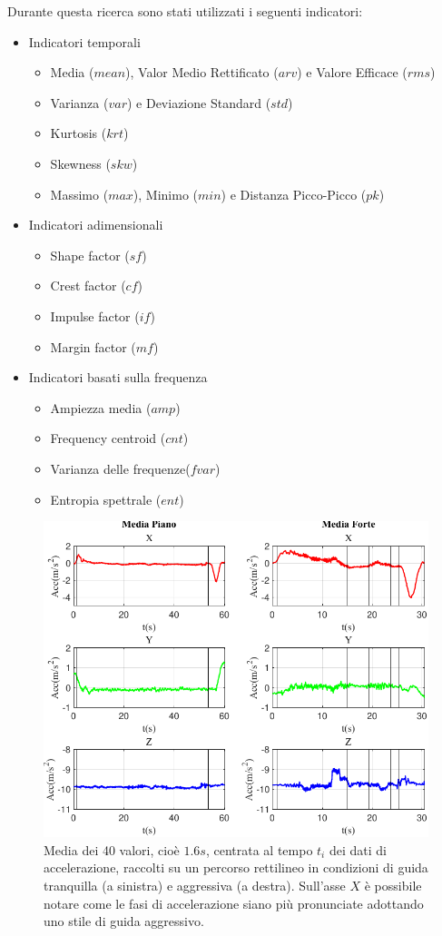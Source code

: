\documentclass[class=article]{standalone}
\begin{document}
	Durante questa ricerca sono stati utilizzati i seguenti indicatori:
	\begin{itemize}
		\item Indicatori temporali
		\begin{itemize}
			\item Media (\(mean\)), Valor Medio Rettificato (\(arv\)) e Valore Efficace (\(rms\))
			\item Varianza (\(var\)) e Deviazione Standard (\(std\))
			\item Kurtosis (\(krt\))
			\item Skewness (\(skw\))
			\item Massimo (\(max\)), Minimo (\(min\)) e Distanza Picco-Picco (\(pk\))
		\end{itemize}
		\item Indicatori adimensionali
		\begin{itemize}
			\item Shape factor (\(sf\))
			\item Crest factor (\(cf\))
			\item Impulse factor (\(if\))
			\item Margin factor (\(mf\))
		\end{itemize}
		\item Indicatori basati sulla frequenza
		\begin{itemize}
			\item Ampiezza media (\(amp\))
			\item Frequency centroid (\(cnt\))
			\item Varianza delle frequenze(\(fvar\))
			\item Entropia spettrale (\(ent\))
		\end{itemize}
	\end{itemize}
	
	\begin{center}
		\begin{figure}[h!]
			\centering\includegraphics[width=.7\textwidth]{img/lungaFP/Acc/Media}
			\caption[]{Media dei 40 valori, cioè \(1.6s\), centrata al tempo \(t_{i}\) dei dati di accelerazione, raccolti su un percorso rettilineo in condizioni di guida tranquilla (a sinistra) e aggressiva (a destra). Sull'asse \(X\) è possibile notare come le fasi di accelerazione siano più pronunciate adottando uno stile di guida aggressivo.}
			\label{fig:AccMedia_lungaFP}
		\end{figure}
	\end{center}
	
\end{document}
